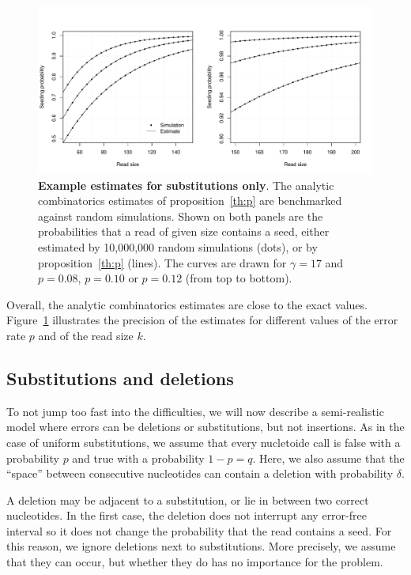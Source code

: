 \documentclass{article}
\begin{document}
\begin{figure}[h]
\centering
\includegraphics[scale=0.445]{simulp.pdf}
\caption{\textbf{Example estimates for substitutions only}. The analytic
combinatorics estimates of proposition~\ref{th:p} are benchmarked against
random simulations. Shown on both panels are the probabilities that a read
of given size contains a seed, either estimated by 10,000,000 random
simulations (dots), or by proposition~\ref{th:p} (lines). The curves are
drawn for $\gamma=17$ and $p=0.08$, $p=0.10$ or $p=0.12$ (from top to
bottom).}
\label{fig:simulp}
\end{figure}

Overall, the analytic combinatorics estimates are close to the exact
values. Figure~\ref{fig:simulp} illustrates the precision of the estimates
for different values of the error rate $p$ and of the read size $k$.




\subsection{Substitutions and deletions}
\label{sec:deletions}

To not jump too fast into the difficulties, we will now describe a
semi-realistic model where errors can be deletions or substitutions, but
not insertions. As in the case of uniform substitutions, we assume that
every nucletoide call is false with a probability $p$ and true with a
probability $1-p=q$. Here, we also assume that the ``space''  between
consecutive nucleotides can contain a deletion with probability $\delta$.

A deletion may be adjacent to a substitution, or lie in between two
correct nucleotides. In the first case, the deletion does not interrupt
any error-free interval so it does not change the probability that the
read contains a seed. For this reason, we ignore deletions next to
substitutions. More precisely, we assume that they can occur, but whether
they do has no importance for the problem.
\end{document}

